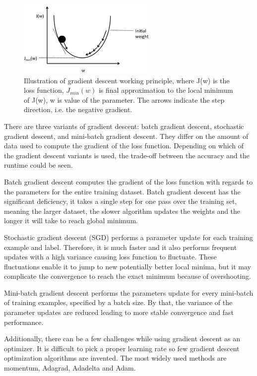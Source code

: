 \begin{figure} [H]
\centering
\includegraphics[width=0.6\textwidth]{figures/GDgraph}
\caption{Illustration of gradient descent working principle, where J(w) is the loss function, $J_{min}(w)$ is final approximation to the local minimum of J(w), w is value of the parameter. The arrows indicate the step direction, i.e. the negative gradient.\citep{Raschka2016}}
\label{fig:GDgraph}  
\end{figure}

\noindent
There are three variants of gradient descent: batch gradient descent, stochastic gradient descent, and mini-batch gradient descent. They differ on the amount of data used to compute the gradient of the loss function. Depending on which of the gradient descent variants is used, the trade-off between the accuracy and the runtime could be seen.

\noindent
Batch gradient descent computes the gradient of the loss function with regards to the parameters for the entire training dataset. Batch gradient descent has the significant deficiency, it takes a single step for one pass over the training set, meaning the larger dataset, the slower algorithm updates the weights and the longer it will take to reach global minimum.\citep{Ruder2016} 

\noindent
Stochastic gradient descent (SGD) performs a parameter update for each training example and label. Therefore, it is much faster and it also performs frequent updates with a high variance causing loss function to fluctuate. These fluctuations enable it to jump to new potentially better local minima, but it may complicate the convergence to reach the exact minimum because of overshooting.\citep{Zhang2014}

\noindent
Mini-batch gradient descent performs the parameters update for every mini-batch of training examples, specified by a batch size. By that, the variance of the parameter updates are reduced leading to more stable convergence and fast performance.\citep{Ruder2016}

\noindent
Additionally, there can be a few challenges while using gradient descent as an optimizer. It is difficult to pick a proper learning rate so few gradient descent optimization algorithms are invented. The most widely used methods are momentum, Adagrad, Adadelta and Adam.\citep{Ruder2016} 

